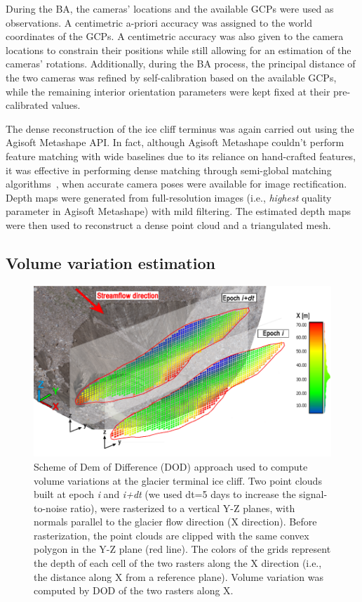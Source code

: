 During the BA, the cameras' locations and the available GCPs were used as observations.
A centimetric a-priori accuracy was assigned to the world coordinates of the GCPs.
A centimetric accuracy was also given to the camera locations to constrain their positions while still allowing for an estimation of the cameras' rotations.
Additionally, during the BA process, the principal distance of the two cameras was refined by self-calibration based on the available GCPs, while the remaining interior orientation parameters were kept fixed at their pre-calibrated values.

The dense reconstruction of the ice cliff terminus was again carried out using the Agisoft Metashape API.
In fact, although Agisoft Metashape couldn't perform feature matching with wide baselines due to its reliance on hand-crafted features, it was effective in performing dense matching through semi-global matching algorithms~\citep{Hirschmuller2012}, when accurate camera poses were available for image
rectification.
Depth maps were generated from full-resolution images (i.e., \textit{highest} quality parameter in Agisoft Metashape) with mild filtering.
The estimated depth maps were then used to reconstruct a dense point cloud and a triangulated mesh.


\subsection{Volume variation estimation}\label{sec:4:volumevariation}

\begin{figure}[ht]
\centering
  \includegraphics[width=1.0\linewidth]{3_dod_scheme.png}
  \caption{Scheme of Dem of Difference (DOD) approach used to compute volume variations
    at the glacier terminal ice cliff.
    Two point clouds built at epoch \textit{i} and \textit{i+dt} (we used dt=5 days to increase the signal-to-noise ratio), were rasterized to a vertical Y-Z planes, with normals parallel to the glacier flow direction (X direction).
    Before rasterization, the point clouds are clipped with the same convex polygon in
    the Y-Z plane (red line).
    The colors of the grids represent the depth of each cell of the two rasters along the X direction (i.e., the distance along X from a reference plane).
    Volume variation was computed by DOD of the two rasters along X.}
  \label{fig:4:dod_scheme}
\end{figure}

